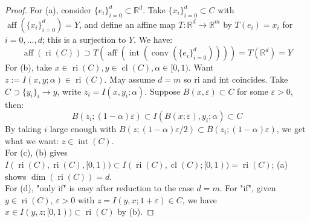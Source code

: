 \begin{proof}
	For (a), consider $\{e_i\}_{i=0}^d\subset \mathbb{R}^d$. Take $\{x_i\}_{i=0}^d\subset C$ with $\operatorname{aff}(\{x_i\}_{i=0}^d)=Y$, and define an affine map $T:\mathbb{R}^d\to \mathbb{R}^m$ by $T(e_i)=x_i$ for $i=0,\dotsc,d$; this is a surjection to $Y$. We have:
	\[
		\operatorname{aff}(\operatorname{ri}(C)) \supset T\left(\operatorname{aff}\left(\operatorname{int}\left(\operatorname{conv}\left(\{e_i\}_{i=0}^d\right)\right)\right)\right)=T(\mathbb{R}^d)=Y
	\]
	For (b), take $x\in \operatorname{ri}(C),y\in \operatorname{cl}(C), \alpha \in[0, 1)$. Want $z:=I(x, y; \alpha )\in\operatorname{ri}(C)$. May assume $d=m$ so ri and int coincides. Take $C\supset\{y_i\}_i\to y$, write $z_i=I(x,y_i;\alpha )$. Suppose $B(x,\varepsilon )\subset C$ for some $\varepsilon >0$, then:
	\[
		B(z_i;(1-\alpha )\varepsilon )\subset I(B(x;\varepsilon ),y_i;\alpha)\subset C
	\]
	By taking $i$ large enough with $B(z;(1-\alpha )\varepsilon /2)\subset B(z_i;(1-\alpha )\varepsilon )$, we get what we want: $z\in \operatorname{int}(C)$.\\
	For (c), (b) gives $I(\operatorname{ri}(C),\operatorname{ri}(C),[0, 1))\subset I(\operatorname{ri}(C),\operatorname{cl}(C);[0,1))=\operatorname{ri}(C)$; (a) shows $\operatorname{dim}(\operatorname{ri}(C))=d$.\\
	For (d), "only if" is easy after reduction to the case $d=m$. For "if", given $y\in \operatorname{ri}(C)$, $\varepsilon>0$ with $z=I(y,x;1+\varepsilon )\in C$, we have $x\in I(y,z;[0,1))\subset \operatorname{ri}(C)$ by (b).
\end{proof}

